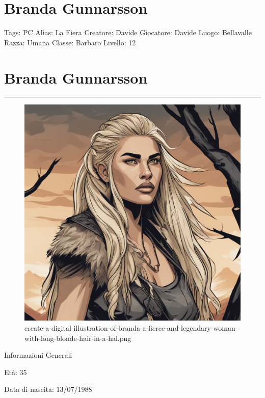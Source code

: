 \section{Branda Gunnarsson}\label{branda-gunnarsson}

Tags: PC Alias: La Fiera Creatore: Davide Giocatore: Davide Luogo:
Bellavalle Razza: Umana Classe: Barbaro Livello: 12

\section{Branda Gunnarsson}\label{branda-gunnarsson-1}

\begin{center}\rule{0.5\linewidth}{0.5pt}\end{center}

\begin{figure}
\centering
\includegraphics{create-a-digital-illustration-of-branda-a-fierce-and-legendary-woman-with-long-blonde-hair-in-a-hal.png}
\caption{create-a-digital-illustration-of-branda-a-fierce-and-legendary-woman-with-long-blonde-hair-in-a-hal.png}
\end{figure}

Informazioni Generali

Età: 35

Data di nascita: 13/07/1988

